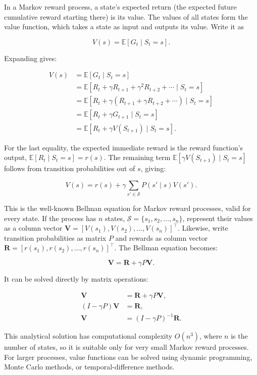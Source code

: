 In a Markov reward process, a state's expected return (the expected future cumulative reward starting there) is its value. The values of all states form the value function, which takes a state as input and outputs its value. Write it as

\[
V(s)=\mathbb{E}[G_t\mid S_t=s].
\]

Expanding gives:

\[
\begin{aligned}
V(s)
&=\mathbb{E}[G_t\mid S_t=s]\\
&=\mathbb{E}[R_t+\gamma R_{t+1}+\gamma^{2} R_{t+2}+\cdots\mid S_t=s]\\
&=\mathbb{E}[R_t+\gamma(R_{t+1}+\gamma R_{t+2}+\cdots)\mid S_t=s]\\
&=\mathbb{E}[R_t+\gamma G_{t+1}\mid S_t=s]\\
&=\mathbb{E}[R_t+\gamma V(S_{t+1})\mid S_t=s].
\end{aligned}
\]

For the last equality, the expected immediate reward is the reward function's output, \(\mathbb{E}[R_t\mid S_t=s]=r(s)\). The remaining term \(\mathbb{E}[\gamma V(S_{t+1})\mid S_t=s]\) follows from transition probabilities out of \(s\), giving:

\[
V(s)=r(s)+\gamma\sum_{s'\in\mathcal{S}}P(s'\mid s)V(s').
\]

This is the well-known Bellman equation for Markov reward processes, valid for every state. If the process has \(n\) states, \(\mathcal{S}=\{s_1,s_2,\ldots,s_n\}\), represent their values as a column vector \(\mathbf{V}=[V(s_1),V(s_2),\ldots,V(s_n)]^{\top}\). Likewise, write transition probabilities as matrix \(P\) and rewards as column vector \(\mathbf{R}=[r(s_1),r(s_2),\ldots,r(s_n)]^{\top}\). The Bellman equation becomes:

\[
\mathbf{V}=\mathbf{R}+\gamma P\mathbf{V}.
\]

It can be solved directly by matrix operations:

\[
\begin{aligned}
\mathbf{V}&=\mathbf{R}+\gamma P\mathbf{V},\\
(I-\gamma P)\mathbf{V}&=\mathbf{R},\\
\mathbf{V}&=(I-\gamma P)^{-1}\mathbf{R}.
\end{aligned}
\]

This analytical solution has computational complexity \(O(n^{3})\), where \(n\) is the number of states, so it is suitable only for very small Markov reward processes. For larger processes, value functions can be solved using dynamic programming, Monte Carlo methods, or temporal-difference methods.

